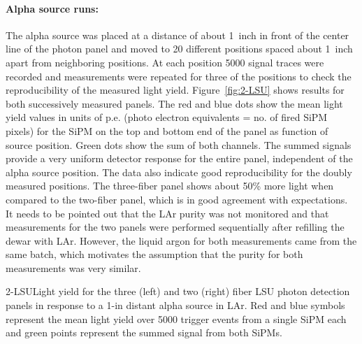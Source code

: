 \paragraph{Alpha source runs:} The alpha source was placed at a distance of about 1~inch in front of the center line of the photon panel and moved to 20 different positions spaced about 1~inch apart from neighboring positions. At each position 5000 signal traces were recorded and measurements were repeated for three of the positions to check the reproducibility of the measured light yield. Figure~\ref{fig:2-LSU} shows results for both successively measured panels. The red and blue dots show the mean light yield values in units of p.e. (photo electron equivalents = no. of fired SiPM pixels) for the SiPM on the top and bottom end of the panel as function of source position. Green dots show the sum of both channels. The summed signals provide  a very uniform detector response for the entire panel, independent of the alpha source position. The data also indicate good reproducibility for the doubly measured positions.
The three-fiber panel shows about 50\% more light when compared to the
two-fiber panel, which is in good agreement with expectations. It needs
to be pointed out that the LAr purity was not monitored and that
measurements for the two panels were performed sequentially after
refilling the dewar with LAr. However, the liquid argon for both
measurements came from the same batch, which motivates the assumption
that the purity for both measurements was very similar.

%
\begin{cdrfigure}{2-LSU}{Light yield for the three (left) and two (right) fiber LSU photon
  detection panels in response to a 1-in distant alpha source in
  LAr. Red and blue symbols represent the mean light yield over 5000
  trigger events from a single SiPM each and green points represent
 the summed signal from both SiPMs.}
\end{cdrfigure}

%
